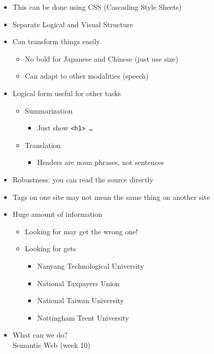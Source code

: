 \documentclass[a4paper,landscape,headrule,footrule,xetex]{foils}
\begin{document}
\begin{itemize}\addtolength{\itemsep}{-1ex}
\item This can be done using CSS (Cascading Style Sheets)
\item Separate Logical and Visual Structure
\end{itemize}


\begin{itemize}
\item Can transform things easily
  \begin{itemize}
  \item No bold for Japanese and Chinese (just use size)
  \item Can adapt to other modalities (speech)
  \end{itemize}
\item Logical form useful for other tasks
  \begin{itemize}
  \item Summarization
    \begin{itemize}
    \item  Just show \texttt{<h1> \ldots\ <h3>}
    \end{itemize}
  \item Translation
    \begin{itemize}
    \item Headers are noun phrases, not sentences
    \end{itemize}
  \end{itemize}
\item Robustness: you can read the source directly
\end{itemize}



\begin{itemize}
\item Tags on one site may not mean the same thing on another site
\item Huge amount of information
  \begin{itemize}
  \item Looking for  may get the wrong one!
  \item Looking for  gets
    \begin{itemize}
    \item Nanyang Technological University
    \item National Taxpayers Union
    \item National Taiwan University
    \item Nottingham Trent University
    \end{itemize}
  \end{itemize}
\item What can we do?
\\ Semantic Web (week 10)
\end{itemize}
\end{document}

